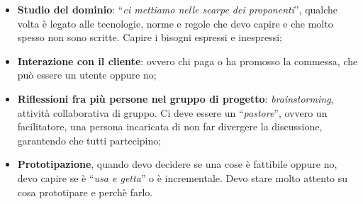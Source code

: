 \begin{itemize}

	\item \textbf{Studio del dominio}: ``\textit{ci mettiamo nelle scarpe dei proponenti}'', qualche volta è legato alle tecnologie, norme e regole che devo capire e che molto spesso non sono scritte. Capire i bisogni espressi e inespressi;
	\item \textbf{Interazione con il cliente}: ovvero chi paga o ha promosso la commessa, che può essere un utente oppure no;
	\item \textbf{Riflessioni fra più persone nel gruppo di progetto}: \textit{brainstorming}, attività collaborativa di gruppo. Ci deve essere un ``\textit{pastore}'', ovvero un facilitatore, una persona incaricata di non far divergere la discussione, garantendo che tutti partecipino;
	\item \textbf{Prototipazione}, quando devo decidere se una cose è fattibile oppure no, devo capire se è ``\textit{usa e getta}'' o è incrementale. Devo stare molto attento su cosa prototipare e perchè farlo.

\end{itemize}